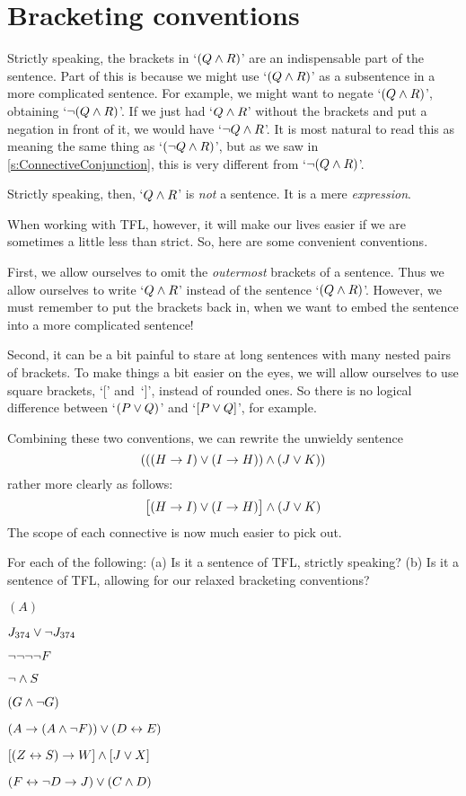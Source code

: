 \section{Bracketing conventions}
\label{TFLconventions}
Strictly speaking, the brackets in `$(Q \wedge R)$' are an indispensable part of the sentence. Part of this is because we might use `$(Q \wedge R)$' as a subsentence in a more complicated sentence. For example, we might want to negate `$(Q \wedge R)$', obtaining `$\neg(Q \wedge R)$'. If we just had `$Q \wedge R$' without the brackets and put a negation in front of it, we would have `$\neg Q \wedge R$'. It is most natural to read this as meaning the same thing as `$(\neg Q \wedge R)$', but as we saw in  \cref{s:ConnectiveConjunction}, this is very different from `$\neg(Q\wedge R)$'.

Strictly speaking, then, `$Q \wedge R$' is \emph{not} a sentence. It is a mere \emph{expression}.

When working with TFL, however, it will make our lives easier if we are sometimes a little less than strict. So, here are some convenient conventions.

First,  we allow ourselves to omit the \emph{outermost} brackets of a sentence. Thus we allow ourselves to write `$Q \wedge R$' instead of the sentence `$(Q \wedge R)$'. However, we must remember to put the brackets back in, when we want to embed the sentence into a more complicated sentence!

Second, it can be a bit painful to stare at long sentences with many nested pairs of brackets. To make things a bit easier on the eyes, we will allow ourselves to use square brackets, `[' and~`]', instead of rounded ones. So there is no logical difference between `$(P\vee Q)$' and `$[P\vee Q]$', for example.

Combining these two conventions, we can rewrite the unwieldy sentence
$$(((H \rightarrow I) \vee (I \rightarrow H)) \wedge (J \vee K))$$
rather more clearly as follows:
$$\bigl[(H \rightarrow I) \vee (I \rightarrow H)\bigr] \wedge (J \vee K)$$
The scope of each connective is now much easier to pick out.

\practiceproblems

\solutions
\problempart
\label{pr.wiffTFL}
For each of the following: (a) Is it a sentence of TFL, strictly speaking? (b) Is it a sentence of TFL, allowing for our relaxed bracketing conventions?
\begin{compactlist}
\item $(A)$
\item $J_{374} \vee \neg J_{374}$
\item $\neg \neg \neg \neg F$
\item $\neg \wedge S$
\item $(G \wedge \neg G)$
\item $(A \rightarrow (A \wedge \neg F)) \vee (D \leftrightarrow E)$
\item $[(Z \leftrightarrow S) \rightarrow W] \wedge [J \vee X]$
\item $(F \leftrightarrow \neg D \rightarrow J) \vee (C \wedge D)$
\end{compactlist}

